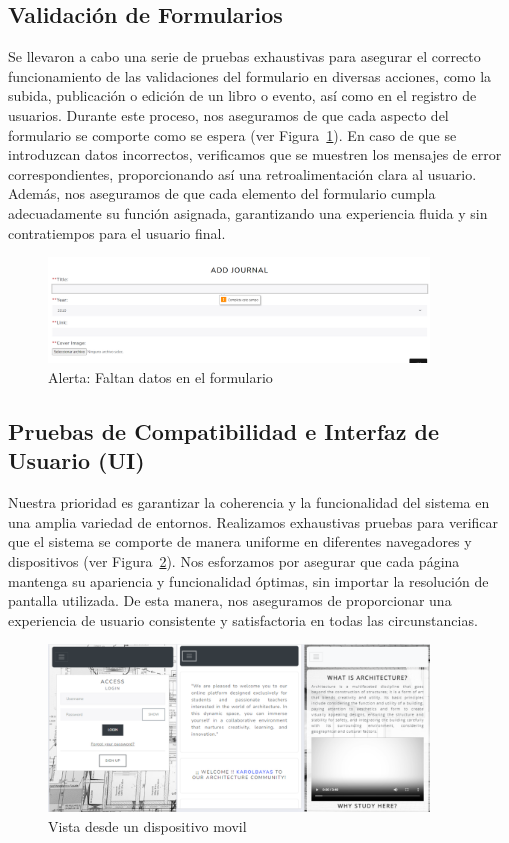 \documentclass[a4paper, 12pt]{book}
\begin{document}
\subsection{Validación de Formularios}
\label{sec:validacion}
Se llevaron a cabo una serie de pruebas exhaustivas para asegurar el correcto funcionamiento de las validaciones del formulario 
en diversas acciones, como la subida, publicación o edición de un libro o evento, así como en el registro de usuarios.
Durante este proceso, nos aseguramos de que cada aspecto del formulario se comporte como se espera (ver Figura~\ref{fig:form}). En caso de que se introduzcan 
datos incorrectos, verificamos que se muestren los mensajes de error correspondientes, proporcionando así una retroalimentación 
clara al usuario. Además, nos aseguramos de que cada elemento del formulario cumpla adecuadamente su función asignada, garantizando 
una experiencia fluida y sin contratiempos para el usuario final.
\begin{figure}
  \centering
  \includegraphics[width=0.9\textwidth]{img/formulario.png}
  \caption{Alerta: Faltan datos en el formulario}
  \label{fig:form}
\end{figure}
\subsection{Pruebas de Compatibilidad e Interfaz de Usuario (UI)}
\label{sec:compatibilidad}
Nuestra prioridad es garantizar la coherencia y la funcionalidad del sistema en una amplia variedad de entornos. Realizamos exhaustivas 
pruebas para verificar que el sistema se comporte de manera uniforme en diferentes navegadores y dispositivos (ver Figura~\ref{fig:movil}). 
Nos esforzamos por asegurar que cada página mantenga su apariencia y funcionalidad óptimas, sin importar la resolución de pantalla utilizada. De esta 
manera, nos aseguramos de proporcionar una experiencia de usuario consistente y satisfactoria en todas las circunstancias.
\begin{figure}
  \centering
  \includegraphics[width=0.9\textwidth]{img/vistamovil.png}
  \caption{Vista desde un dispositivo movil}
  \label{fig:movil}
\end{figure}
\end{document}

